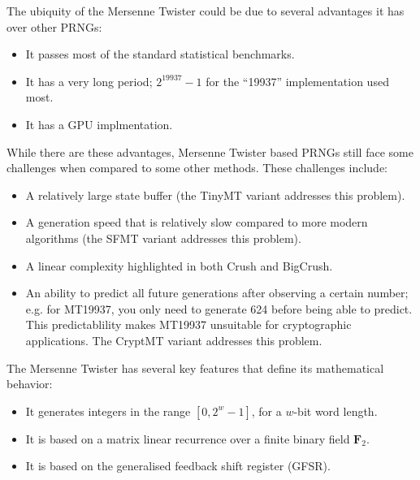 \documentclass{article}
\begin{document}
            The ubiquity of the Mersenne Twister could be due to several advantages it has over other PRNGs:

            \begin{itemize}
                \item It passes most of the standard statistical benchmarks\cite{TestU01}.
                \item It has a very long period; $2^{19937} - 1$ for the ``19937'' implementation used most.
                \item It has a GPU implmentation\cite{MTGP}.
            \end{itemize}

            While there are these advantages, Mersenne Twister based PRNGs still face some challenges when compared to some other methods.  These challenges include:

            \begin{itemize}
                \item A relatively large state buffer (the TinyMT variant addresses this problem\cite{TinyMT}).
                \item A generation speed that is relatively slow compared to more modern algorithms (the SFMT variant addresses this problem\cite{SFMT}).
                \item A linear complexity highlighted in both Crush and BigCrush\cite{TestU01}.
                \item An ability to predict all future generations after observing a certain number; e.g. for MT19937, you only need to generate 624 before being able to predict.  This predictablility makes MT19937 unsuitable for cryptographic applications.  The CryptMT variant addresses this problem\cite{CryptMT}.
            \end{itemize}

            The Mersenne Twister has several key features that define its mathematical behavior:

            \begin{itemize}
                \item It generates integers in the range $[0, 2^w - 1]$, for a $w$-bit word length.
                \item It is based on a matrix linear recurrence over a finite binary field $\mathbf{F}_2$.
                \item It is based on the generalised feedback shift register (GFSR)\cite{TwistedGFSR}.
            \end{itemize}
\end{document}
